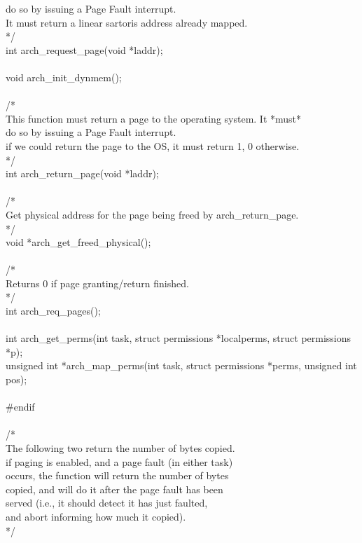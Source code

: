 \documentclass[11pt, letterpaper, twoside, english]{book}
\begin{document}
\begin{sf}
do so by issuing a Page Fault interrupt.\\
It must return a linear sartoris address already mapped.\\
*/\\
int arch\_request\_page(void *laddr);\\
\\
void arch\_init\_dynmem();\\
\\
/*\\
This function must return a page to the operating system. It *must*\\
do so by issuing a Page Fault interrupt.\\
if we could return the page to the OS, it must return 1, 0 otherwise.\\
*/\\
int arch\_return\_page(void *laddr);\\
\\
/*\\
Get physical address for the page being freed by arch\_return\_page.\\
*/\\
void *arch\_get\_freed\_physical();\\
\\
/*\\
Returns 0 if page granting/return finished.\\
*/\\
int arch\_req\_pages();\\
\\
int arch\_get\_perms(int task, struct permissions *localperms, struct permissions *p);\\
unsigned int *arch\_map\_perms(int task, struct permissions *perms, unsigned int pos);\\
\\
\#endif\\
\\
/* \\
  The following two return the number of bytes copied.\\
  if paging is enabled, and a page fault (in either task)\\
  occurs, the function will return the number of bytes\\
  copied, and will do it after the page fault has been\\
  served (i.e., it should detect it has just faulted,\\
  and abort informing how much it copied).\\
*/\\

\end{sf}
\end{document}
